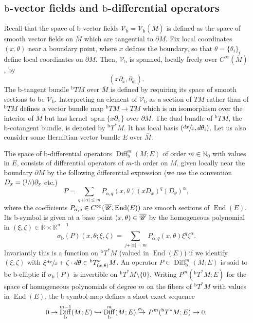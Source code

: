 \documentclass[11pt]{article}
\numberwithin{equation}{section}
\newcommand\hto{\mathrel{\lhook\joinrel\to}}
\newcommand{\Psfrac}[2]{(\sfrac{#1}{#2})}
\let\backslash\setminus
\theoremstyle{plain}
\theoremstyle{definition}
\newcommand {\N}{\mathbb{N}}
\newcommand{\R}{{\mathbb{R}}}
\newcommand\calV{{\mathcal V}}
\newcommand{\bb}{{\mathrm{b}}}
\DeclareMathOperator{\Diff}{Diff}
\DeclareMathOperator{\End}{End}
\DeclareMathOperator{\Span}{span}
\newcommand{\Cinf}{C^\infty}
\newcommand{\dM}{{\partial M}}
\newcommand{\Mbar}{{\overline{M}}}\let\M\Mbar
\begin{document}
\subsection{\texorpdfstring{$\bb$}{b}-vector fields and \texorpdfstring{$\bb$}{b}-differential operators} \label{subsec:bvector fields diff ops}
Recall that the space of b\nobreakdash-vector fields $\mathcal{V}_\bb = \mathcal{V}_\bb(\Mbar)$ is defined as the
space of smooth vector fields on $\Mbar$ which are tangential to $\partial M$.
Fix local coordinates $(x,\theta)$ near a boundary point, where $x$ defines the boundary, so that $\theta = \{\theta_i\}_i$ define local coordinates on $\partial M$.
Then, $\mathcal{V}_\bb$ is spanned, locally freely over $\Cinf(\Mbar)$, by
\[
(x\partial_{x}, \partial_{\theta_{i}}).
\]
The b-tangent bundle $^\bb TM$ over $\Mbar$ is defined by requiring its space of smooth sections to be
$\mathcal{V}_\bb$. Interpreting an element of $\calV_\bb$ as a section of $TM$ rather than of $^\bb TM$ defines a vector bundle map $^\bb TM\to TM$ which is an isomorphism over the interior of $M$ but has kernel $\Span\{x\partial_x\}$ over $\dM$. The dual bundle of $^\bb TM$, the b-cotangent bundle, is denoted by $^\bb T^*M$. It has local basis $(\sfrac{dx}x, d\theta_i)$.
Let us also consider some Hermitian vector bundle $E$ over $\Mbar$.

The space of b-differential operators $\Diff^{m}_\bb(M; E)$ of order $m \in \N_0$ with values in $E$,
consists of differential operators of $m$-th order on $M$, given locally near the boundary $\partial M$ by
the following differential expression (we use the convention $D_x = \Psfrac{1}{i}\partial_x$ etc.)%
\begin{equation}\label{b operator}
P = \sum_{q+ \vert \alpha\vert \leq m} P_{\alpha, q}(x,\theta)(xD_{x})^{q}(D_{\theta})^{\alpha},
\end{equation}
where the coefficients $P_{\alpha, q} \in C^\infty (\overline{\U},\End(E))$ are smooth sections of $\End(E)$.
Its b-symbol is given at a base point $(x,\theta) \in \overline{\mathscr{U}}$
by the homogeneous polynomial in $(\xi,\zeta)\in\R\times\R^{n-1}$
\begin{equation*}
\sigma_\bb(P)(x,\theta; \xi,\zeta) = \sum_{j+ \vert \alpha \vert = m} P_{\alpha, q}(x,\theta) \xi^{q}\zeta^{\alpha}.
\end{equation*}
Invariantly this is a function on $^\bb T^*M$ (valued in $\End(E)$) if we identify $(\xi,\zeta)$ with $\xi\sfrac{dx}x+\zeta\cdot d\theta \in {}^\bb T^*_{(x,\theta)}M$. An operator $P \in \Diff^{m}_\bb(M; E)$ is said to be b-elliptic if
$\sigma_\bb(P)$ is invertible on $^\bb T^{*}M \backslash \{0\} $. Writing $P^{m}(^\bb T^{*}M; E)$ for the space of
homogeneous polynomials of degree $m$ on the fibers of $^\bb T^{*}M$ with values in $\End(E)$, the
b-symbol map defines a short exact sequence
\begin{equation}
0 \to \Diff_\bb^{m-1}(M; E) \hto \Diff_\bb^{m}(M; E)
\overset{\sigma_\bb \ }{\to} P^{m}(^\bb T^{*}M; E) \to 0.
\end{equation}
\end{document}
